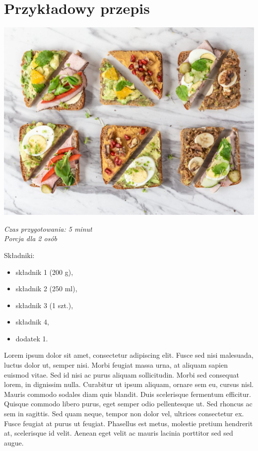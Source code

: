 \section{Przykładowy przepis}
\vspace*{8pt}

\includegraphics[width=\linewidth]{przystawki/img/kanapki}
\vspace{2pt}

\textit{Czas przygotowania: 5 minut}\\
\textit{Porcja dla 2 osób}\\

\vspace{2pt}

Składniki:
\begin{itemize}
	\item składnik 1 (200 g),
	\item składnik 2 (250 ml),
	\item składnik 3 (1 szt.),
	\item składnik 4,
	\item dodatek 1.
\end{itemize}

Lorem ipsum dolor sit amet, consectetur adipiscing elit. Fusce sed nisi malesuada, luctus dolor ut, semper nisi. Morbi feugiat massa urna, at aliquam sapien euismod vitae. Sed id nisi ac purus aliquam sollicitudin. Morbi sed consequat lorem, in dignissim nulla. Curabitur ut ipsum aliquam, ornare sem eu, cursus nisl. Mauris commodo sodales diam quis blandit. Duis scelerisque fermentum efficitur. Quisque commodo libero purus, eget semper odio pellentesque ut. Sed rhoncus ac sem in sagittis. Sed quam neque, tempor non dolor vel, ultrices consectetur ex. Fusce feugiat at purus ut feugiat. Phasellus est metus, molestie pretium hendrerit at, scelerisque id velit. Aenean eget velit ac mauris lacinia porttitor sed sed augue.

